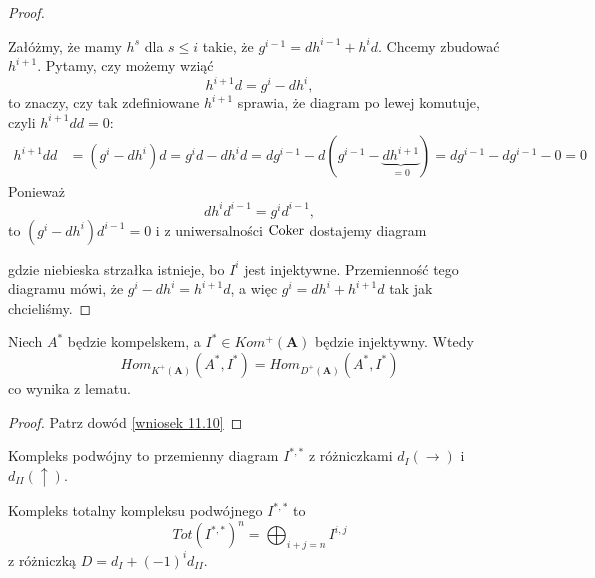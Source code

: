 \begin{proof}
  \begin{center}\end{center}
  Załóżmy, że mamy $h^s$ dla $s\leq i$ takie, że $g^{i-1}=dh^{i-1}+h^id$. Chcemy zbudować $h^{i+1}$.
  Pytamy, czy możemy wziąć
  $$h^{i+1}d=g^i-dh^i,$$
  to znaczy, czy tak zdefiniowane $h^{i+1}$ sprawia, że diagram po lewej komutuje, czyli $h^{i+1}dd=0$:
  \begin{align*}
    h^{i+1}dd&=(g^i-dh^i)d=g^id-dh^id=dg^{i-1}-d(g^{i-1}-\underbrace{dh^{i+1}}_{=0})=dg^{i-1}-dg^{i-1}-0=0
  \end{align*}
  Ponieważ
  $$dh^id^{i-1}=g^id^{i-1},$$
  to $(g^i-dh^i)d^{i-1}=0$ i z uniwersalności $\operatorname{Coker}$ dostajemy diagram
  \begin{center}\end{center}
  gdzie niebieska strzałka istnieje, bo $I^i$ jest injektywne. Przemienność tego diagramu mówi, że $g^i-dh^i=h^{i+1}d$, a więc $g^i=dh^i+h^{i+1}d$ tak jak chcieliśmy.
\end{proof}

\begin{conclusion}\label{wniosek 12.2}
  Niech $A^*$ będzie kompelskem, a $I^*\in Kom^+(\mathbf{A})$ będzie injektywny. Wtedy 
  $$Hom_{K^+(\mathbf{A})}(A^*, I^*)=Hom_{D^+(\mathbf{A})}(A^*, I^*)$$
  co wynika z lematu.
\end{conclusion}

\begin{proof}Patrz dowód \ref{wniosek 11.10}
\end{proof}



  \begin{definition}
    Kompleks podwójny to przemienny diagram $I^{*,*}$ z różniczkami $d_I(\to)$ i $d_{II}(\uparrow)$.

    Kompleks totalny kompleksu podwójnego $I^{*,*}$ to 
    $$Tot(I^{*,*})^n=\bigoplus_{i+j=n}I^{i,j}$$
    z różniczką $D=d_I+(-1)^id_{II}$. 
  \end{definition}

